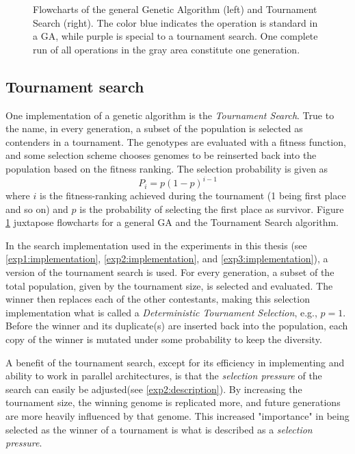 \begin{figure}[ht]
\begin{subfigure}[ht]{0.25\linewidth}
    \end{subfigure}
    \caption[Algorithm flowcharts]{Flowcharts of the general Genetic Algorithm (left) and Tournament Search (right). The color blue indicates the operation is standard in a GA, while purple is special to a tournament search. One complete run of all operations in the gray area constitute one generation.}
    \label{fig:algorithmflowcharts}
\end{figure}

\subsection{Tournament search}
One implementation of a genetic algorithm is the \textit{Tournament Search}. True to the name, in every generation, a subset of the population is selected as contenders in a tournament. The genotypes are evaluated with a fitness function, and some selection scheme chooses genomes to be reinserted back into the population based on the fitness ranking. The selection probability is given as 
\begin{equation}
    \label{eq:tournamentsearch}
    P_{i} = p(1-p)^{i-1}
\end{equation}
where \(i\) is the fitness-ranking achieved during the tournament (1 being first place and so on) and \(p\) is the probability of selecting the first place as survivor. Figure \ref{fig:algorithmflowcharts} juxtapose flowcharts for a general GA and the Tournament Search algorithm. 

In the search implementation used in the experiments in this thesis (see \ref{exp1:implementation}, \ref{exp2:implementation}, and \ref{exp3:implementation}), a version of the tournament search is used. For every generation, a subset of the total population, given by the tournament size, is selected and evaluated. The winner then replaces each of the other contestants, making this selection implementation what is called a \textit{Deterministic Tournament Selection}, e.g., \(p=1\). Before the winner and its duplicate(s) are inserted back into the population, each copy of the winner is mutated under some probability to keep the diversity. 

A benefit of the tournament search, except for its efficiency in implementing and ability to work in parallel architectures, is that the \textit{selection pressure} of the search can easily be adjusted(see \ref{exp2:description}). By increasing the tournament size, the winning genome is replicated more, and future generations are more heavily influenced by that genome. This increased "importance" in being selected as the winner of a tournament is what is described as a \textit{selection pressure}.

